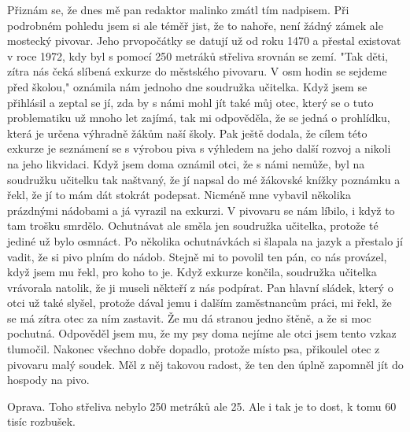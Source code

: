 
Přiznám se, že dnes mě pan redaktor malinko zmátl tím nadpisem. Při
podrobném pohledu jsem si ale téměř jist, že to nahoře, není žádný
zámek ale mostecký pivovar. Jeho prvopočátky se datují už od roku 1470
a přestal existovat v roce 1972, kdy byl s pomocí 250 metráků střeliva
srovnán se zemí. "Tak děti, zítra nás čeká slíbená exkurze do
městského pivovaru. V osm hodin se sejdeme před školou," oznámila nám
jednoho dne soudružka učitelka. Když jsem se přihlásil a zeptal se jí,
zda by s námi mohl jít také můj otec, který se o tuto problematiku už
mnoho let zajímá, tak mi odpověděla, že se jedná o prohlídku, která je
určena výhradně žákům naší školy. Pak ještě dodala, že cílem této
exkurze je seznámení se s výrobou piva s výhledem na jeho další rozvoj
a nikoli na jeho likvidaci. Když jsem doma oznámil otci, že s námi
nemůže, byl na soudružku učitelku tak naštvaný, že jí napsal do mé
žákovské knížky poznámku a řekl, že jí to mám dát stokrát podepsat.
Nicméně mne vybavil několika prázdnými nádobami a já vyrazil na
exkurzi. V pivovaru se nám líbilo, i když to tam trošku smrdělo.
Ochutnávat ale směla jen soudružka učitelka, protože té jediné už bylo
osmnáct. Po několika ochutnávkách si šlapala na jazyk a přestalo jí
vadit, že si pivo plním do nádob. Stejně mi to povolil ten pán, co nás
provázel, když jsem mu řekl, pro koho to je. Když exkurze končila,
soudružka učitelka vrávorala natolik, že ji museli někteří z nás
podpírat. Pan hlavní sládek, který o otci už také slyšel, protože
dával jemu i dalším zaměstnancům práci, mi řekl, že se má zítra otec
za ním zastavit. Že mu dá stranou jedno štěně, a že si moc pochutná.
Odpověděl jsem mu, že my psy doma nejíme ale otci jsem tento vzkaz
tlumočil. Nakonec všechno dobře dopadlo, protože místo psa, přikoulel
otec z pivovaru malý soudek. Měl z něj takovou radost, že ten den
úplně zapomněl jít do hospody na pivo.

Oprava. Toho střeliva nebylo 250 metráků ale 25. Ale i tak je to dost,
k tomu 60 tisíc rozbušek.
